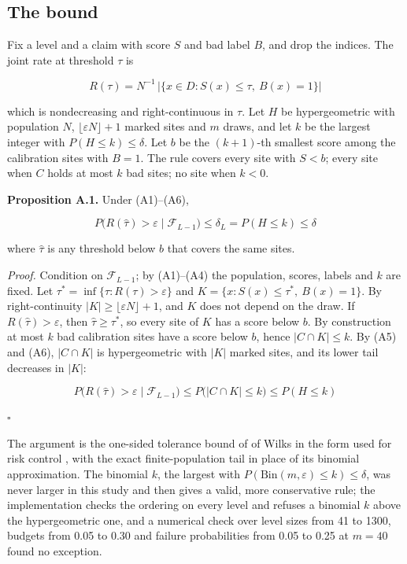 \documentclass{iopjournal}
\begin{document}
\hypertarget{the-bound}{%
\subsection{The bound}\label{the-bound}}

Fix a level and a claim with score \(S\) and bad label \(B\), and drop the indices. The joint rate at threshold \(\tau\) is

\[
R(\tau) = N^{-1} \, \lvert \{x \in D : S(x) \le \tau,\ B(x) = 1\} \rvert
\]

which is nondecreasing and right-continuous in \(\tau\). Let \(H\) be hypergeometric with population \(N\), \(\lfloor \varepsilon N \rfloor + 1\) marked sites and \(m\) draws, and let \(k\) be the largest integer with \(P(H \le k) \le \delta\). Let \(b\) be the \((k+1)\)-th smallest score among the calibration sites with \(B = 1\). The rule covers every site with \(S < b\); every site when \(C\) holds at most \(k\) bad sites; no site when \(k < 0\).

\textbf{Proposition A.1.} Under (A1)--(A6),

\[
P\big(R(\hat\tau) > \varepsilon \mid \mathcal{F}_{L-1}\big) \le \delta_L = P(H \le k) \le \delta
\]

where \(\hat\tau\) is any threshold below \(b\) that covers the same sites.

\emph{Proof.} Condition on \(\mathcal{F}_{L-1}\); by (A1)--(A4) the population, scores, labels and \(k\) are fixed. Let \(\tau^\ast = \inf\{\tau : R(\tau) > \varepsilon\}\) and \(K = \{x : S(x) \le \tau^\ast,\ B(x) = 1\}\). By right-continuity \(|K| \ge \lfloor \varepsilon N \rfloor + 1\), and \(K\) does not depend on the draw. If \(R(\hat\tau) > \varepsilon\), then \(\hat\tau \ge \tau^\ast\), so every site of \(K\) has a score below \(b\). By construction at most \(k\) bad calibration sites have a score below \(b\), hence \(|C \cap K| \le k\). By (A5) and (A6), \(|C \cap K|\) is hypergeometric with \(|K|\) marked sites, and its lower tail decreases in \(|K|\):

\[
P\big(R(\hat\tau) > \varepsilon \mid \mathcal{F}_{L-1}\big) \le P\big(|C \cap K| \le k\big) \le P(H \le k)
\]

\(\square\)

The argument is the one-sided tolerance bound of of Wilks \cite{Wilks1941} in the form used for risk control \cite{Bates2021,Angelopoulos2025}, with the exact finite-population tail in place of its binomial approximation. The binomial \(k\), the largest with \(P(\mathrm{Bin}(m, \varepsilon) \le k) \le \delta\), was never larger in this study and then gives a valid, more conservative rule; the implementation checks the ordering on every level and refuses a binomial \(k\) above the hypergeometric one, and a numerical check over level sizes from 41 to 1300, budgets from 0.05 to 0.30 and failure probabilities from 0.05 to 0.25 at \(m = 40\) found no exception.
\end{document}
